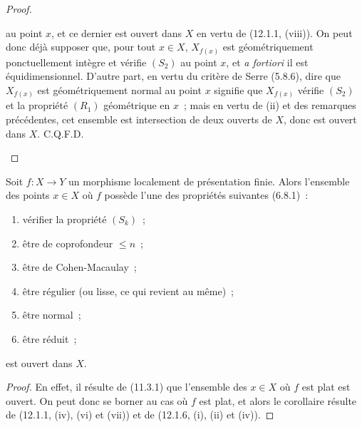 \begin{proof}
\begin{enumerate}[label=(\roman*)]
  au point $x$, et ce dernier est ouvert dans $X$ en vertu de (12.1.1,
  (viii)). On peut donc déjà supposer que, pour tout $x\in X$, $X_{f(x)}$ est
  géométriquement ponctuellement intègre et vérifie $(S_2)$ au point $x$, et
  \emph{a fortiori} il est équidimensionnel. D'autre part, en vertu du critère
  de Serre (5.8.6), dire que $X_{f(x)}$ est géométriquement normal au point $x$
  signifie que $X_{f(x)}$ vérifie $(S_2)$ et la propriété $(R_1)$ géométrique
  en $x$~;
  mais en vertu de (ii) et des remarques précédentes, cet ensemble est
  intersection de deux ouverts de $X$, donc est ouvert dans $X$. C.Q.F.D.
\end{enumerate}
\end{proof}

\begin{corollary}[12.1.7]
\label{IV.12.1.7-fr}
Soit $f:X\to Y$ un morphisme localement de présentation finie. Alors
l'ensemble des points $x\in X$ où $f$ possède l'une des propriétés suivantes
(6.8.1)~:
\begin{enumerate}[label=(\roman*)]
  \item vérifier la propriété $(S_k)$~;
  \item être de coprofondeur $\leq n$~;
  \item être de Cohen-Macaulay~;
  \item être régulier (ou lisse, ce qui revient au même)~;
  \item être normal~;
  \item être réduit~;
\end{enumerate}
est ouvert dans $X$.
\end{corollary}

\begin{proof}
En effet, il résulte de (11.3.1) que l'ensemble des $x\in X$ où $f$ est plat
est ouvert. On peut donc se borner au cas où $f$ est plat, et alors le
corollaire résulte de (12.1.1, (iv), (vi) et (vii)) et de (12.1.6, (i), (ii)
et (iv)).
\end{proof}

